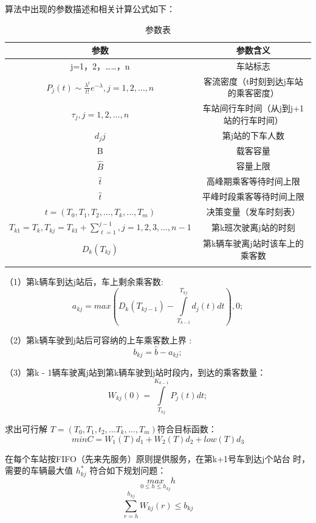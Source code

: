 算法中出现的参数描述和相关计算公式如下：
\begin{table}[htbp!]
    \centering
    \caption{参数表}\label{teble_3}
    \begin{tabular}{cc}
        \whline
        参数 & 参数含义 \\
        \hline
        j=1，2，……，n & 车站标志\\
        $P_j(t) \sim \frac{\lambda^t}{t!}e^{-\lambda},j=1,2,…,n$ & 客流密度（t时刻到达j车站的乘客密度）\\
        $\tau_j,j=1,2,…,n$ & 车站间行车时间（从j到j+1站的行车时间）\\
        $d_j{j}$ & 第j站的下车人数\\
        B & 载客容量 \\
        $\hat{B}$ & 容量上限\\
        $\widehat{t}$ &  高峰期乘客等待时间上限 \\
        $\hat{t}$ & 平峰时段乘客等待时间上限 \\
        $t = (T_0,T_1,T_2,…,T_k,…,T_m)$ & 决策变量（发车时刻表）\\
        $T_{k1} = T_k, T_{kj} = T_{k1} + \sum_{\ell = 1}^{j-1}, j = 1, 2, 3, …,n-1$ & 第k班次驶离j站的时刻 \\
        $D_k(T_{kj})$ & 第k辆车驶离j站时该车上的乘客数\\
        \whline
    \end{tabular}
\end{table}


（1）第k辆车到达j站后，车上剩余乘客数:
$$
a_{kj} = max{(D_k(T_{kj-1}) - \int\limits_{T_{k-1}}^{T_{kj}}d_j(t)dt ), 0};
$$

（2）第k辆车驶到j站后可容纳的上车乘客数上界 :
$$
b_{kj} = \hat{b} - a_{kj};
$$

（3）第k - 1辆车驶离j站到第k辆车驶到j站时段内，到达的乘客数量：
$$
W_{kj}(0) = \int\limits_{T_{kj}}^{K_{k-1}}P_j(t)dt;
$$

求出可行解 $T = (T_0,T_1,t_2,…T_k,…,T_m)$符合目标函数：
$$
min C = W_1(T)d_1+W_2(T)d_2 + low(T)d_3
$$

在每个车站按FIFO（先来先服务）原则提供服务，在第k+1号车到达j个站台
时，需要的车辆最大值 $h_{kj}^*$ 符合如下规划问题：
$$
\underset{0 \le h \le h_{kj}}{max} h  
$$
$$
\sum_{r=h}^{h_{kj}}W_{kj}(r) \le b_{kj}
$$


